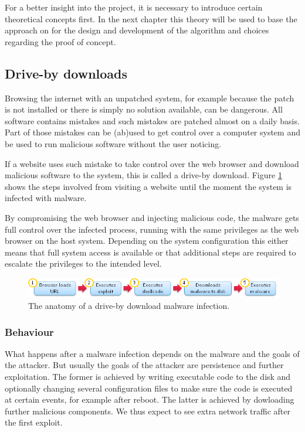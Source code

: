 For a better insight into the project, it is necessary to introduce certain theoretical concepts first. In the next chapter this theory will be used to base the approach on for the design and development of the algorithm and choices regarding the proof of concept.

\subsection{Drive-by downloads}

Browsing the internet with an unpatched system, for example because the patch is not installed or there is simply no solution available, can be dangerous. All software contains mistakes and such mistakes are patched almost on a daily basis. Part of those mistakes can be (ab)used to get control over a computer system and be used to run malicious software without the user noticing.

If a website uses such mistake to take control over the web browser and download malicious software to the system, this is called a drive-by download\cite{Le2013}. Figure \ref{fig:dbdownload} shows the steps involved from visiting a website until the moment the system is infected with malware.

By compromising the web browser and injecting malicious code, the malware gets full control over the infected process, running with the same privileges as the web browser on the host system. Depending on the system configuration this either means that full system access is available or that additional steps are required to escalate the privileges to the intended level.


\begin{figure}[h]
    \centering
    \includegraphics[width=12cm]{Images/drive-by-download.png}
    \caption{The anatomy of a drive-by download malware infection. \cite{dbdownload-anatomy}}
    \label{fig:dbdownload}
\end{figure}

\subsubsection{Behaviour}
\label{sec:behavior}

What happens after a malware infection depends on the malware and the goals of the attacker. But usually the goals of the attacker are persistence and further exploitation. The former is achieved by writing executable code to the disk and optionally changing several configuration files to make sure the code is executed at certain events, for example after reboot. The latter is achieved by dowloading further malicious components. We thus expect to see extra network traffic after the first exploit.

